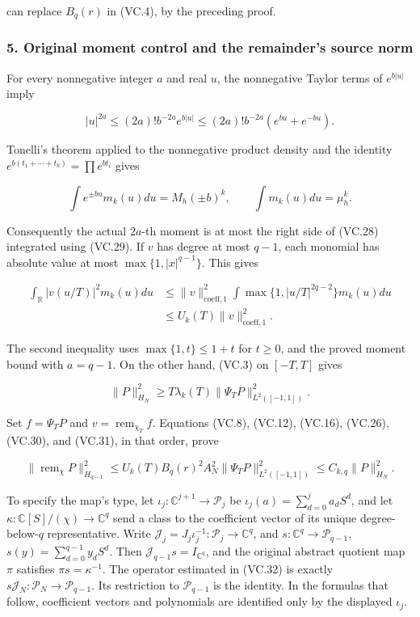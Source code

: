 can replace \(B_q(r)\) in (VC.4), by the preceding proof.

\subsubsection{5. Original moment control and the remainder's source norm}\label{endpoint-volume_connection_original--original-moment-control-and-the-remainders-source-norm}

For every nonnegative integer \(a\) and real \(u\), the nonnegative Taylor terms of \(e^{b|u|}\) imply

\[
 |u|^{2a}\le(2a)!b^{-2a}e^{b|u|}
 \le(2a)!b^{-2a}(e^{bu}+e^{-bu}).
\tag{VC.28}
\]

Tonelli's theorem applied to the nonnegative product density and the identity \(e^{b(t_1+\cdots+t_k)}=\prod e^{bt_i}\) gives

\[
 \int e^{\pm bu}m_k(u)du=M_h(\pm b)^k,
 \qquad \int m_k(u)du=\mu_h^k.
\tag{VC.29}
\]

Consequently the actual \(2a\)-th moment is at most the right side of (VC.28) integrated using (VC.29). If \(v\) has degree at most \(q-1\), each monomial has absolute value at most \(\max\{1,|x|^{q-1}\}\). This gives

\[
\begin{split}
 \int_{\mathbb R}|v(u/T)|^2m_k(u)du
 &\le \|v\|_{\mathrm{coeff},1}^{2}
          \int\max\{1,|u/T|^{2q-2}\}m_k(u)du\\
 &\le U_k(T)\|v\|_{\mathrm{coeff},1}^{2}.
\end{split}
\tag{VC.30}
\]

The second inequality uses \(\max\{1,t\}\le1+t\) for \(t\ge0\), and the proved moment bound with \(a=q-1\). On the other hand, (VC.3) on \([-T,T]\) gives

\[
 \|P\|_{H_N}^{2}\ge
       T\lambda_k(T)\|\Psi_TP\|_{L^2([-1,1])}^{2}.
\tag{VC.31}
\]

Set \(f=\Psi_TP\) and \(v=\operatorname{rem}_{\chi_T}f\). Equations (VC.8), (VC.12), (VC.16), (VC.26), (VC.30), and (VC.31), in that order, prove

\[
 \|\operatorname{rem}_{\chi}P\|_{H_{q-1}}^{2}
 \le U_k(T)B_q(r)^2A_N^2
                      \|\Psi_TP\|_{L^2([-1,1])}^{2}
 \le C_{k,q}\|P\|_{H_N}^{2}.
\tag{VC.32}
\]

To specify the map's type, let \(\iota_j:\mathbb C^{j+1}\to\mathcal P_j\) be \(\iota_j(a)=\sum_{d=0}^ja_dS^d\), and let \(\kappa:\mathbb C[S]/(\chi)\to\mathbb C^q\) send a class to the coefficient vector of its unique degree-below-\(q\) representative. Write \(\mathcal J_j=J_j\iota_j^{-1}:\mathcal P_j\to\mathbb C^q\), and \(s:\mathbb C^q\to\mathcal P_{q-1}\), \(s(y)=\sum_{d=0}^{q-1}y_dS^d\). Then \(\mathcal J_{q-1}s=I_{\mathbb C^q}\), and the original abstract quotient map \(\pi\) satisfies \(\pi s=\kappa^{-1}\). The operator estimated in (VC.32) is exactly \(s\mathcal J_N:\mathcal P_N\to\mathcal P_{q-1}\). Its restriction to \(\mathcal P_{q-1}\) is the identity. In the formulas that follow, coefficient vectors and polynomials are identified only by the displayed \(\iota_j\).

